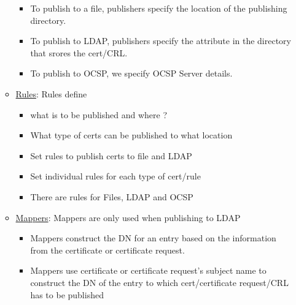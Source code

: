 \documentclass[12pt]{report}
\begin{document}
\begin{itemize}
\begin{itemize}
\begin{itemize}
                            \item To publish to a file, publishers specify the location of the publishing directory.
                            \item To publish to LDAP, publishers specify the attribute in the directory that srores the cert/CRL.
                            \item To publish to OCSP, we specify OCSP Server details. 
                        \end{itemize}
                    \item \underline{Rules}: Rules define 
                        \begin{itemize}
                            \item what is to be published and where ?
                            \item What type of certs can be published to what location
                            \item Set rules to publish certs to file and LDAP
                            \item Set individual rules for each type of cert/rule
                            \item There are rules for Files, LDAP and OCSP
                        \end{itemize}
                    \item \underline{Mappers}: Mappers are only used when publishing to LDAP
                        \begin{itemize}
                            \item Mappers construct the DN for an entry based on the information
                                from the certificate or certificate request. 
                            \item Mappers use certificate or certificate request's subject name to
                                construct the DN of the entry to which cert/certificate request/CRL has to be published
                        \end{itemize}
            \end{itemize}
    \end{itemize}
\end{document}
